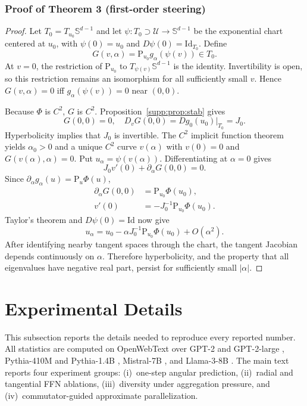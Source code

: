 \documentclass[11pt]{article}
\newcommand{\Sph}{\mathbb{S}}
\newcommand{\Proj}{\mathrm{P}}
\newcommand{\id}{\mathrm{Id}}
\begin{document}
\subsubsection{Proof of Theorem 3 (first-order steering)}
\begin{proof}
Let $T_0=T_{u_0}\Sph^{d-1}$ and let
$\psi:T_0\supset\mathcal U\to\Sph^{d-1}$ be the exponential chart centered at
$u_0$, with $\psi(0)=u_0$ and $D\psi(0)=\id_{T_0}$. Define
\begin{equation}
G(v,\alpha)=\Proj_{u_0}g_\alpha(\psi(v))\in T_0.
\label{eq:steering-G}
\end{equation}
At $v=0$, the restriction of $\Proj_{u_0}$ to
$T_{\psi(v)}\Sph^{d-1}$ is the identity. Invertibility is open, so this
restriction remains an isomorphism for all sufficiently small $v$. Hence
$G(v,\alpha)=0$ iff $g_\alpha(\psi(v))=0$ near $(0,0)$.

Because $\Phi$ is $C^2$, $G$ is $C^2$. Proposition~\ref{supp:prop:stab} gives
\begin{equation}
G(0,0)=0,
\quad
D_vG(0,0)=Dg_0(u_0)|_{T_0}=J_0.
\end{equation}
Hyperbolicity implies that $J_0$ is invertible. The $C^2$ implicit function
theorem yields $\alpha_0>0$ and a unique $C^2$ curve $v(\alpha)$ with
$v(0)=0$ and $G(v(\alpha),\alpha)=0$. Put
$u_\alpha=\psi(v(\alpha))$. Differentiating at $\alpha=0$ gives
\begin{equation}
J_0v'(0)+\partial_\alpha G(0,0)=0.
\end{equation}
Since $\partial_\alpha g_\alpha(u)=\Proj_u\Phi(u)$,
\begin{equation}
\begin{aligned}
\partial_\alpha G(0,0)
&=\Proj_{u_0}\Phi(u_0),\\
v'(0)
&=-J_0^{-1}\Proj_{u_0}\Phi(u_0).
\end{aligned}
\end{equation}
Taylor's theorem and $D\psi(0)=\id$ now give
\begin{equation}
u_\alpha
=u_0-\alpha J_0^{-1}\Proj_{u_0}\Phi(u_0)+O(\alpha^2).
\end{equation}
After identifying nearby tangent spaces through the chart, the tangent Jacobian
depends continuously on $\alpha$. Therefore hyperbolicity, and the property that
all eigenvalues have negative real part, persist for sufficiently small
$|\alpha|$.
\end{proof}


\section{Experimental Details}\label{app:experimental-details}
\sloppy
This subsection reports the details needed to reproduce every reported number. All statistics are
computed on OpenWebText \citep{gokaslan2019openwebtext} over GPT-2 and GPT-2-large
\citep{radford2019language}, Pythia-410M and Pythia-1.4B \citep{biderman2023pythia},
Mistral-7B \citep{jiang2023mistral}, and Llama-3-8B \citep{dubey2024llama}. The main
text reports four experiment groups: (i)~one-step angular prediction, (ii)~radial and
tangential FFN ablations, (iii)~diversity under aggregation pressure, and
(iv)~commutator-guided approximate parallelization.
 
\end{document}
